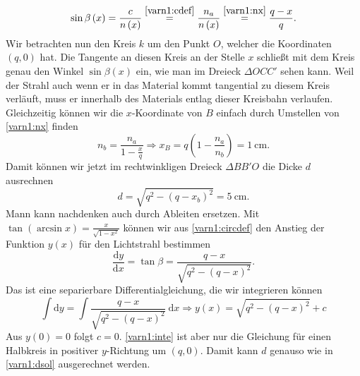 \begin{Answer}[ref = varn1]
	\begin{equation}\label{varn1:circdef}
		\sin \beta\left(x\right) = \frac{c}{n\left(x\right)} \overset{\eqref{varn1:cdef}}{=} \frac{n_a}{n\left(x\right)} \overset{\eqref{varn1:nx}}{=} \frac{q-x}{q}.
	\end{equation}
	Wir betrachten nun den Kreis $k$ um den Punkt $O$, welcher die Koordinaten $\left(q,0\right)$ hat. Die Tangente an diesen Kreis an der Stelle $x$ schließt mit dem Kreis genau den Winkel $\sin \beta\left(x\right)$ ein, wie man im Dreieck $\Delta OCC'$ sehen kann. Weil der Strahl auch wenn er in das Material kommt tangential zu diesem Kreis verläuft, muss er innerhalb des Materials entlag dieser Kreisbahn verlaufen.\\
	Gleichzeitig können wir die $x$-Koordinate von $B$ einfach durch Umstellen von \eqref{varn1:nx} finden
	\begin{equation}\label{varn1:xb}
		n_b = \frac{n_a}{1-\frac{x}{q}}\Rightarrow x_B =q \left(1-\frac{n_a}{n_b}\right) = 1~\mathrm{cm}.
	\end{equation}
	Damit können wir jetzt im rechtwinkligen Dreieck $\Delta BB'O$ die Dicke $d$ ausrechnen
	\begin{equation}\label{varn1:dsol}
	\boxed{
		d = \sqrt{q^2-\left(q-x_b\right)^2} = 5~\mathrm{cm}.}
	\end{equation}
	Mann kann nachdenken auch durch Ableiten ersetzen. Mit $\tan\left(\arcsin x\right) = \frac{x}{\sqrt{1-x^2}}$ können wir aus \eqref{varn1:circdef} den Anstieg der Funktion $y\left(x\right)$ für den Lichtstrahl bestimmen
	\begin{equation*}
		\frac{\mathrm{d}y}{\mathrm{d}x} = \tan \beta = \frac{q-x}{\sqrt{q^2-\left(q-x\right)^2}}.
	\end{equation*}
	Das ist eine separierbare Differentialgleichung, die wir integrieren können
	\begin{equation}\label{varn1:inte}
		\int \mathrm{d}y = \int \frac{q-x}{\sqrt{q^2-\left(q-x\right)^2}}~\mathrm{d}x \Rightarrow y\left(x\right)= \sqrt{q^2-\left(q-x\right)^2}+c
	\end{equation}
	Aus $y\left(0\right)= 0$ folgt $c=0$. \eqref{varn1:inte} ist aber nur die Gleichung für einen Halbkreis in positiver $y$-Richtung um $\left(q,0\right)$. Damit kann $d$ genauso wie in \eqref{varn1:dsol} ausgerechnet werden.
	
\end{Answer}